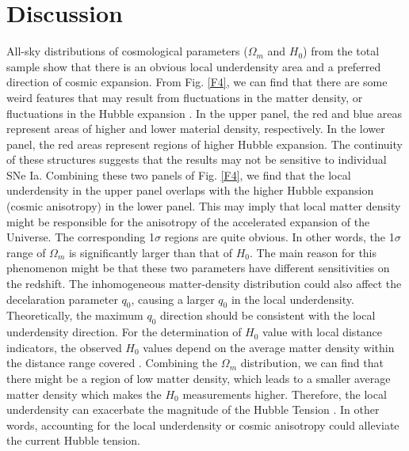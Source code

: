 \documentclass{aa}
\begin{document}
\section{Discussion}
All-sky distributions of cosmological parameters ($\Omega_{m}$ and $H_{0}$) from the total sample show that there is an obvious local underdensity area and a preferred direction of cosmic expansion. From Fig. \ref{F4}, we can find that there are some weird features that may result from fluctuations in the matter density, or fluctuations in the Hubble expansion \citep{Gurzadyan2023}. In the upper panel, the red and blue areas represent areas of higher and lower material density, respectively. In the lower panel, the red areas represent regions of higher Hubble expansion. The continuity of these structures suggests that the results may not be sensitive to individual SNe Ia. Combining these two panels of Fig. \ref{F4}, we find that the local underdensity in the upper panel overlaps with the higher Hubble expansion (cosmic anisotropy) in the lower panel. This may imply that local matter density might be responsible for the anisotropy of the accelerated expansion of the Universe. The corresponding 1$\sigma$ regions are quite obvious. In other words, the 1$\sigma$ range of $\Omega_{m}$ is significantly larger than that of $H_{0}$. The main reason for this phenomenon might be that these two parameters have different sensitivities on the redshift. The inhomogeneous matter-density distribution could also affect the decelaration parameter $q_{0}$, causing a larger $q_{0}$ in the local underdensity. Theoretically, the maximum $q_{0}$ direction should be consistent with the local underdensity direction. For the determination of $H_{0}$ value with local distance indicators, the observed $H_{0}$ values depend on the average matter density within the distance range covered \citep{2020A&A...633A..19B}. Combining the $\Omega_{m}$ distribution, we can find that there might be a region of low matter density, which leads to a smaller average matter density which makes the $H_{0}$ measurements higher. Therefore, the local underdensity can exacerbate the magnitude of the Hubble Tension \citep{2020A&A...633A..19B,2022MNRAS.517..576H,2023A&A...674A..45J,2023Univ....9...94H}. In other words, accounting for the local underdensity or cosmic anisotropy could alleviate the current Hubble tension.
\end{document}
